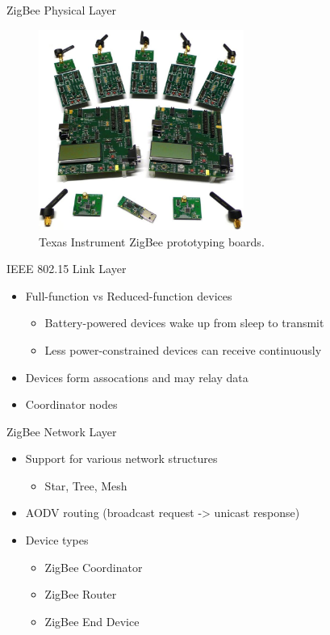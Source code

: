 \documentclass{beamer}
\begin{document}
\begin{frame}{ZigBee Physical Layer}
  \begin{figure}
  \includegraphics[width=0.6\textwidth]{ti_zigbee_devkit}
  \caption{Texas Instrument ZigBee prototyping boards.}
  \end{figure}
\end{frame}
    
\begin{frame}{IEEE 802.15 Link Layer}
  \begin{itemize}
    \item Full-function vs Reduced-function devices
	\begin{itemize}
  		\item Battery-powered devices wake up from sleep to transmit
  		\item Less power-constrained devices can receive continuously
	\end{itemize}
	
  	\item Devices form assocations and may relay data
  	\item Coordinator nodes
  \end{itemize}
\end{frame}

\begin{frame}{ZigBee Network Layer}
  \begin{itemize}
  	\item Support for various network structures
  	\begin{itemize}
  		\item Star, Tree, Mesh
  	\end{itemize}
  	\item AODV routing (broadcast request -> unicast response)
  	\item Device types
  	\begin{itemize}
  		\item ZigBee Coordinator
  		\item ZigBee Router
  		\item ZigBee End Device
  	\end{itemize}
  \end{itemize}
\end{frame}
\end{document}
